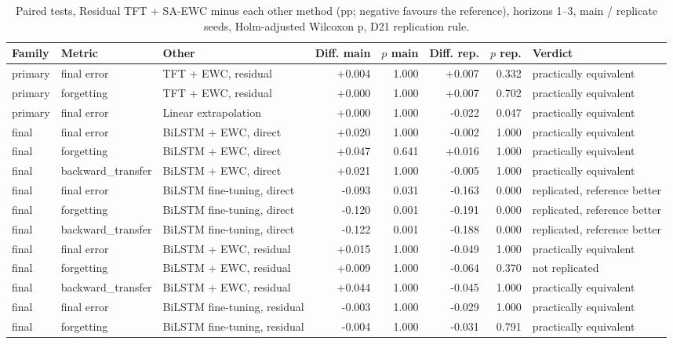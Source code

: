 \begin{table}[t]
  \centering
  \caption{Paired tests, Residual TFT + SA-EWC minus each other method (pp; negative favours the reference), horizons 1--3, main / replicate seeds, Holm-adjusted Wilcoxon p, D21 replication rule.}
  \label{tab:d24-tests-e1}
  \setlength{\tabcolsep}{3pt}
  \scriptsize
  \begin{tabular}{lllrrrrl}
    \toprule
    Family & Metric & Other & Diff. main & $p$ main & Diff. rep. & $p$ rep. & Verdict \\
    \midrule
    primary & final error & TFT + EWC, residual & +0.004 & 1.000 & +0.007 & 0.332 & practically equivalent \\
    primary & forgetting & TFT + EWC, residual & +0.000 & 1.000 & +0.007 & 0.702 & practically equivalent \\
    primary & final error & Linear extrapolation & +0.000 & 1.000 & -0.022 & 0.047 & practically equivalent \\
    final & final error & BiLSTM + EWC, direct & +0.020 & 1.000 & -0.002 & 1.000 & practically equivalent \\
    final & forgetting & BiLSTM + EWC, direct & +0.047 & 0.641 & +0.016 & 1.000 & practically equivalent \\
    final & backward\_transfer & BiLSTM + EWC, direct & +0.021 & 1.000 & -0.005 & 1.000 & practically equivalent \\
    final & final error & BiLSTM fine-tuning, direct & -0.093 & 0.031 & -0.163 & 0.000 & replicated, reference better \\
    final & forgetting & BiLSTM fine-tuning, direct & -0.120 & 0.001 & -0.191 & 0.000 & replicated, reference better \\
    final & backward\_transfer & BiLSTM fine-tuning, direct & -0.122 & 0.001 & -0.188 & 0.000 & replicated, reference better \\
    final & final error & BiLSTM + EWC, residual & +0.015 & 1.000 & -0.049 & 1.000 & practically equivalent \\
    final & forgetting & BiLSTM + EWC, residual & +0.009 & 1.000 & -0.064 & 0.370 & not replicated \\
    final & backward\_transfer & BiLSTM + EWC, residual & +0.044 & 1.000 & -0.045 & 1.000 & practically equivalent \\
    final & final error & BiLSTM fine-tuning, residual & -0.003 & 1.000 & -0.029 & 1.000 & practically equivalent \\
    final & forgetting & BiLSTM fine-tuning, residual & -0.004 & 1.000 & -0.031 & 0.791 & practically equivalent \\

\end{tabular}
\end{table}
